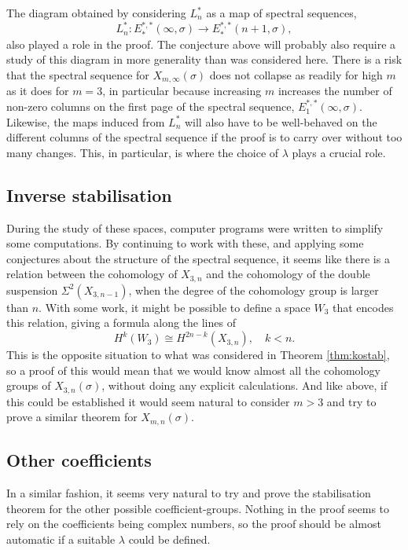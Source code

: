 The diagram obtained by considering $L_n^*$ as a map of spectral
sequences,
\[ L_n^* : E_*^{*,*}(\infty,\sigma) \to E_*^{*,*}(n+1,\sigma), \]
also played a role in the proof. The conjecture above will probably
also require a study of this diagram in more generality than was
considered here. There is a risk that the spectral sequence for
$X_{m,\infty}(\sigma)$ does not collapse as readily for high $m$ as it
does for $m=3$, in particular because increasing $m$ increases the
number of non-zero columns on the first page of the spectral sequence,
$E_1^{*,*}(\infty,\sigma)$. Likewise, the maps induced from $L_n^*$
will also have to be well-behaved on the different columns of the
spectral sequence if the proof is to carry over without too many
changes. This, in particular, is where the choice of $\lambda$ plays
a crucial role.

\subsection{Inverse stabilisation}

During the study of these spaces, computer programs were written
to simplify some computations. By continuing to work with these, and
applying some conjectures about the structure of the spectral
sequence, it seems like there is a relation between the cohomology
of $X_{3,n}$ and the cohomology of the double suspension
$\Sigma^2(X_{3,n-1})$,
when the degree of the cohomology group is larger than
$n$. With some work, it might be possible to define
a space $W_3$ that encodes this relation, giving a formula along the
lines of
\[ H^k(W_3) \cong H^{2n-k}(X_{3,n}), \quad k < n. \]
This is the opposite situation to what was considered in
Theorem \ref{thm:kostab}, so a proof of this would mean that we
would know almost all the cohomology groups of $X_{3,n}(\sigma)$,
without doing any explicit calculations.
And like above, if this could be established it would seem natural to
consider $m > 3$ and try to prove a similar theorem for
$X_{m,n}(\sigma)$.

\subsection{Other coefficients}

In a similar fashion, it seems very natural to try and prove the
stabilisation theorem for the other possible
coefficient-groups. Nothing in the proof seems to rely on the
coefficients being complex numbers, so the proof should be almost
automatic if a suitable $\lambda$ could be defined.

